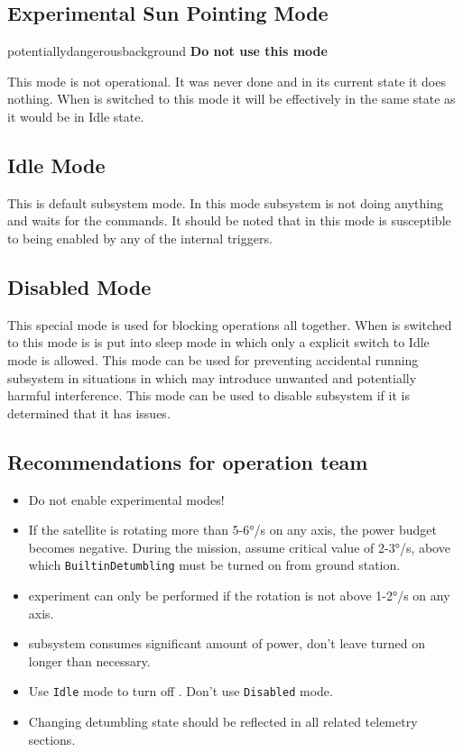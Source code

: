 \subsection{Experimental Sun Pointing Mode}

\begin{coloriconbox}{\faWarning}{potentiallydangerousbackground}
    \textbf{Do not use this mode}
\end{coloriconbox}

This mode is not operational. It was never done and in its current state it does nothing. 
When \Adcs is switched to this mode it will be effectively in the same state as it would 
be in Idle state.  

\subsection{Idle Mode}

This is default \Adcs subsystem mode. In this mode \Adcs subsystem is not 
doing anything and waits for the commands. It should be noted that in this mode \Adcs is 
susceptible to being enabled by any of the \obc internal triggers. 

\subsection{Disabled Mode}

This special mode is used for blocking \Adcs operations all together. When 
\Adcs is switched to this mode is is put into sleep mode in which only a
explicit switch to Idle mode is allowed. This mode can be used for preventing
accidental running \Adcs subsystem in situations in which \Adcs may introduce 
unwanted and potentially harmful interference. This mode can be used to disable 
\Adcs subsystem if it is determined that it has issues. 

\subsection{Recommendations for operation team}
\begin{itemize}
    \item Do not enable experimental modes!
    \item If the satellite is rotating more than 5-6°/s on any axis, the power budget becomes negative. 
    During the mission, assume critical value of 2-3°/s, above which \texttt{BuiltinDetumbling} must be 
    turned on from ground station.
    \item \sads experiment can only be performed if the rotation is not above 1-2°/s on any axis.    
    \item \Adcs subsystem consumes significant amount of power, don't leave turned on longer than necessary.
    \item Use \texttt{Idle} mode to turn off \Adcs. Don't use \texttt{Disabled} mode.
    \item Changing detumbling state should be reflected in all \Imtq related telemetry sections.
\end{itemize}

